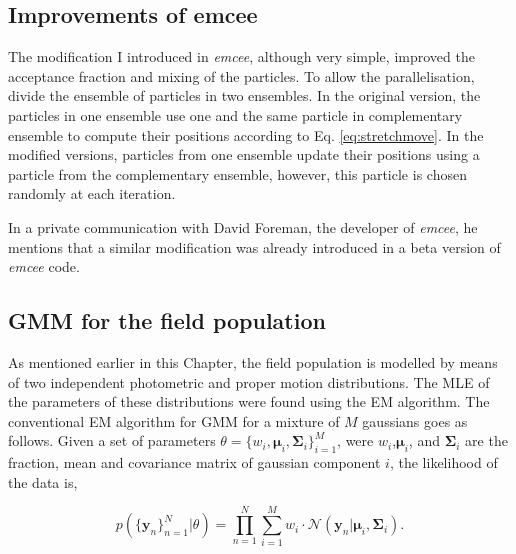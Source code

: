 \subsection{Improvements of emcee}
The modification I introduced in \emph{emcee}, although very simple, improved the acceptance fraction and mixing of the particles.
To allow the parallelisation, \citet{Foreman2013} divide the ensemble of particles in two ensembles. In the original version, the particles in one ensemble use one and the same particle in complementary ensemble to compute their positions according to Eq. \ref{eq:stretchmove}. In the modified versions, particles from one ensemble update their positions using a particle from the complementary ensemble, however, this particle is chosen randomly at each iteration. 

In a private communication with David Foreman, the developer of \emph{emcee}, he mentions that a similar modification was already introduced in a beta version of \emph{emcee} code.

\subsection{GMM for the field population}
As mentioned earlier in this Chapter, the field population is modelled by means of two independent photometric and proper motion distributions. The MLE of the parameters of these distributions were found using the EM algorithm.  The conventional EM algorithm for GMM \citep{Dempster1977} for a mixture of $M$ gaussians goes as follows. Given a set of parameters $\theta=\{w_i,\boldsymbol{\mu}_i,\boldsymbol{\Sigma}_i\}_{i=1}^M$, were $w_i$,$\boldsymbol{\mu}_i$, and $\boldsymbol{\Sigma}_i$ are the fraction, mean and covariance matrix of gaussian component $i$, the likelihood of the data is,

\begin{equation}
p(\{\mathbf{y}_n\}_{n=1}^N|\theta)=\prod_{n=1}^N {\sum_{i=1} ^M {w_i\cdot \mathcal{N}(\mathbf{y}_n|\boldsymbol{\mu}_i,\boldsymbol{\Sigma}_i)}}.
\end{equation}

